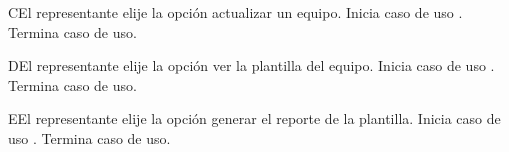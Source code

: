 	\begin{UCtrayectoriaA}{C}{El representante elije la opción actualizar un equipo.}
		\UCpaso Inicia caso de uso .
  		\UCpaso Termina caso de uso.
	\end{UCtrayectoriaA}
	
	\begin{UCtrayectoriaA}{D}{El representante elije la opción ver la plantilla del equipo.}
		\UCpaso Inicia caso de uso .
  		\UCpaso Termina caso de uso.
	\end{UCtrayectoriaA}
	
	\begin{UCtrayectoriaA}{E}{El representante elije la opción generar el reporte de la plantilla.}
		\UCpaso Inicia caso de uso .
  		\UCpaso Termina caso de uso.
	\end{UCtrayectoriaA}
